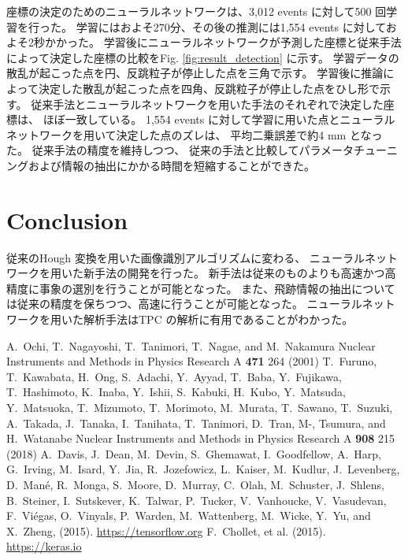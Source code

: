 \documentclass{jps-cp}
\begin{document}
座標の決定のためのニューラルネットワークは、3,012 events に対して500 回学習を行った。
学習にはおよそ270分、その後の推測には1,554 events に対しておよそ2秒かかった。
学習後にニューラルネットワークが予測した座標と従来手法によって決定した座標の比較をFig. \ref{fig:result_detection} に示す。
学習データの散乱が起こった点を円、反跳粒子が停止した点を三角で示す。
学習後に推論によって決定した散乱が起こった点を四角、反跳粒子が停止した点をひし形で示す。
従来手法とニューラルネットワークを用いた手法のそれぞれで決定した座標は、
ほぼ一致している。
1,554 events に対して学習に用いた点とニューラルネットワークを用いて決定した点のズレは、
平均二乗誤差で約4 mm となった。
従来手法の精度を維持しつつ、
従来の手法と比較してパラメータチューニングおよび情報の抽出にかかる時間を短縮することができた。

\section{Conclusion}
従来のHough 変換を用いた画像識別アルゴリズムに変わる、
ニューラルネットワークを用いた新手法の開発を行った。
新手法は従来のものよりも高速かつ高精度に事象の選別を行うことが可能となった。
また、飛跡情報の抽出については従来の精度を保ちつつ、高速に行うことが可能となった。
ニューラルネットワークを用いた解析手法はTPC の解析に有用であることがわかった。

\begin{thebibliography}{9}
  A.~Ochi, T.~Nagayoshi, T.~Tanimori, T.~Nagae, and M.~Nakamura
  Nuclear Instruments and Methods in Physics Research A \textbf{471} 264 (2001)
  T.~Furuno, T.~Kawabata, H.~Ong, S.~Adachi, Y.~Ayyad, T.~Baba, Y.~Fujikawa, T.~Hashimoto, K.~Inaba, Y.~Ishii,
  S.~Kabuki, H.~Kubo, Y.~Matsuda, Y.~Matsuoka, T.~Mizumoto, T.~Morimoto, M.~Murata, T.~Sawano, T.~Suzuki, A.~Takada,
  J.~Tanaka, I.~Tanihata, T.~Tanimori, D.~Tran, M-, Tsumura, and H.~Watanabe
  Nuclear Instruments and Methods in Physics Research A \textbf{908} 215 (2018)
  A.~Davis, J.~Dean, M.~Devin, S.~Ghemawat, I.~Goodfellow, A.~Harp, G.~Irving,
  M.~Isard, Y.~Jia, R.~Jozefowicz, L.~Kaiser, M.~Kudlur, J.~Levenberg,
  D.~Man\'{e}, R.~Monga, S.~Moore, D.~Murray, C.~Olah, M.~Schuster, J.~Shlens,
  B.~Steiner, I.~Sutskever, K.~Talwar, P.~Tucker, V.~Vanhoucke, V.~Vasudevan,
  F.~Vi\'{e}gas, O.~Vinyals, P.~Warden, M.~Wattenberg, M.~Wicke, Y.~Yu, and
  X.~Zheng, (2015).
  \url{https://tensorflow.org}
  F.~Chollet, et al. (2015). \url{https://keras.io}

\end{thebibliography}
\end{document}
